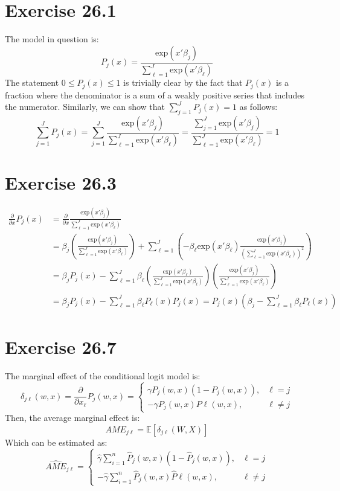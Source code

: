 \documentclass{article}
\newcommand{\sumn}{\sum_{i=1}^{n}}
\newcommand{\e}[1]{\text{exp}\left(#1\right)}
\newcommand{\E}[1]{\mathbb{E}\left[#1\right]}%
\begin{document}
\pagebreak
\section*{Exercise 26.1}
The model in question is:
\[
	P_j(x) = \frac{\e{x'\beta_j}}{\sum_{\ell=1}^J\e{x'\beta_\ell}}
\]
The statement $0\leq P_j(x) \leq 1$ is trivially clear by the fact that $P_j(x)$ is a fraction where the denominator is a sum of a weakly positive series that includes the numerator. Similarly, we can show that ${\sum_{j=1}^J P_j(x)=1}$ as follows:
\[
	\sum_{j=1}^J P_j(x)=\sum_{j=1}^J \frac{\e{x'\beta_j}}{\sum_{\ell=1}^J\e{x'\beta_\ell}}
		= \frac{\sum_{j=1}^J \e{x'\beta_j}}{\sum_{\ell=1}^J\e{x'\beta_\ell}} = 1
\]


\section*{Exercise 26.3}
\begin{align*}
	\frac{\partial}{\partial x} P_j(x) &= \frac{\partial}{\partial x} \frac{\e{x'\beta_j}}{\sum_{\ell=1}^J\e{x'\beta_\ell}}					\\
		&= \beta_j\left(\frac{\e{x'\beta_j}}{\sum_{\ell=1}^J\e{x'\beta_\ell}}\right) 
			+ \sum_{\ell=1}^J\left(-\beta_\ell\e{x'\beta_\ell}\frac{\e{x'\beta_j}}{\left(\sum_{\ell=1}^J\e{x'\beta_\ell}\right)^2}\right)	\\
		&= \beta_jP_j(x) - \sum_{\ell=1}^J\beta_\ell\left(\frac{\e{x'\beta_\ell}}{\sum_{\ell=1}^J\e{x'\beta_\ell}}\right)
			\left(\frac{\e{x'\beta_j}}{\sum_{\ell=1}^J\e{x'\beta_\ell}}\right)																\\
		&= \beta_jP_j(x) - \sum_{\ell=1}^J\beta_\ell P_\ell(x)P_j(x) = P_j(x)\left(\beta_j-\sum_{\ell=1}^J\beta_\ell P_\ell(x)\right)
\end{align*}


\section*{Exercise 26.7}
The marginal effect of the conditional logit model is:
\[
	\delta_{j\ell}(w,x) =\frac{\partial}{\partial x_\ell}P_j(w,x) 
		= 	\begin{cases}
				\gamma P_j(w,x)\left(1-P_j(w,x)\right), & \ell=j 	\\
				-\gamma P_j(w,x)P\ell(w,x),				&\ell\neq j
			\end{cases}
\]
Then, the average marginal effect is:
\[
	AME_{j\ell} = \E{\delta_{j\ell}(W,X)}
\]
Which can be estimated as:
\[
	\widehat{AME}_{j\ell} = \begin{cases}
								\hat{\gamma}  \sumn \hat{P}_j(w,x)\left(1-\hat{P}_j(w,x)\right), 	& \ell=j 	\\
								-\hat{\gamma} \sumn \hat{P}_j(w,x)\hat{P}\ell(w,x),					&\ell\neq j
							\end{cases}
\]
\end{document}
